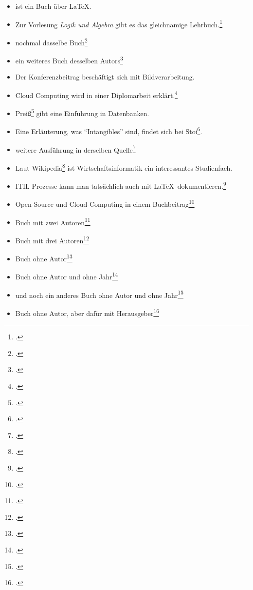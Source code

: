 \begin{itemize}
\item \cite{Aslam2018} ist ein Buch über \LaTeX.
\item Zur Vorlesung \emph{Logik und Algebra} gibt es das gleichnamige Lehrbuch.\footcite{Staab}
\item nochmal dasselbe Buch\footcite{Staab}
\item ein weiteres Buch desselben Autors\footcite{BuschlingerStaab}

\item Der Konferenzbeitrag \cite{Ancuti} beschäftigt sich mit Bildverarbeitung.
\item Cloud Computing wird in einer Diplomarbeit erklärt.\footcite[S.~14]{Boettger:Diplomarbeit}
\item Preiß\footcite{Preiss} gibt eine Einführung in Datenbanken.
\item Eine Erläuterung, was \enquote{Intangibles} sind, findet sich bei Stoi\footcite[S.~82]{Stoi}.
\item weitere Ausführung in derselben Quelle\footcite[Vgl.][S.~84]{Stoi}
\item Laut Wikipedia\footcite[Abschnitt~5]{wiki:Wirtschaftsinformatik} ist Wirtschaftsinformatik ein interessantes Studienfach.
\item ITIL-Prozesse kann man tatsächlich auch mit \LaTeX\ dokumentieren.\footcite{Carvalho:PJ:2012-1}
\item Open-Source und Cloud-Computing in einem Buchbeitrag\footcite{Wind}
\item Buch mit zwei Autoren\footcite{MitZweiAutoren}
\item Buch mit drei Autoren\footcite{MitDreiAutoren}
\item Buch ohne Autor\footcite{OhneAutoren}
\item Buch ohne Autor und ohne Jahr\footcite{OhneAutorenOhneJahr}
\item und noch ein anderes Buch ohne Autor und ohne Jahr\footcite{OhneAutorenOhneJahr2}
\item Buch ohne Autor, aber dafür mit Herausgeber\footcite{keinAutorAberHerausgeber}


\end{itemize}
